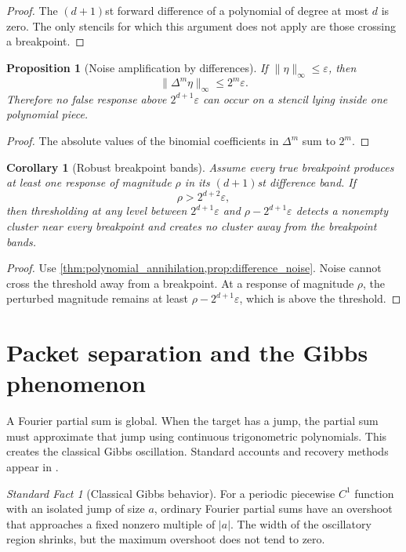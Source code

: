 \documentclass[11pt,a4paper]{article}
\newtheorem{proposition}[theorem]{Proposition}
\newtheorem{corollary}[theorem]{Corollary}
\theoremstyle{definition}
\theoremstyle{remark}
\newtheorem{standardfact}[theorem]{Standard Fact}
\begin{document}
\begin{proof}
The \((d+1)\)st forward difference of a polynomial of degree at most \(d\) is zero. The only stencils for which this argument does not apply are those crossing a breakpoint.
\end{proof}

\begin{proposition}[Noise amplification by differences]\label{prop:difference_noise}
If \(\|\eta\|_\infty\leq\varepsilon\), then
\[
\|\Delta^m\eta\|_\infty
\leq
2^m\varepsilon.
\]
Therefore no false response above \(2^{d+1}\varepsilon\) can occur on a stencil lying inside one polynomial piece.
\end{proposition}

\begin{proof}
The absolute values of the binomial coefficients in \(\Delta^m\) sum to \(2^m\).
\end{proof}

\begin{corollary}[Robust breakpoint bands]\label{cor:robust_breakpoint_bands}
Assume every true breakpoint produces at least one response of magnitude \(\rho\) in its \((d+1)\)st difference band. If
\[
\rho>2^{d+2}\varepsilon,
\]
then thresholding at any level between \(2^{d+1}\varepsilon\) and \(\rho-2^{d+1}\varepsilon\) detects a nonempty cluster near every breakpoint and creates no cluster away from the breakpoint bands.
\end{corollary}

\begin{proof}
Use \cref{thm:polynomial_annihilation,prop:difference_noise}. Noise cannot cross the threshold away from a breakpoint. At a response of magnitude \(\rho\), the perturbed magnitude remains at least \(\rho-2^{d+1}\varepsilon\), which is above the threshold.
\end{proof}

\section{Packet separation and the Gibbs phenomenon}\label{extension:section:11}\label{sec:gibbs}

A Fourier partial sum is global. When the target has a jump, the partial sum must approximate that jump using continuous trigonometric polynomials. This creates the classical Gibbs oscillation. Standard accounts and recovery methods appear in \cite{Zygmund2002,GottliebShu1997}.

\begin{standardfact}[Classical Gibbs behavior]\label{sf:gibbs_behavior}
For a periodic piecewise \(C^1\) function with an isolated jump of size \(a\), ordinary Fourier partial sums have an overshoot that approaches a fixed nonzero multiple of \(|a|\). The width of the oscillatory region shrinks, but the maximum overshoot does not tend to zero.
\end{standardfact}
\end{document}
